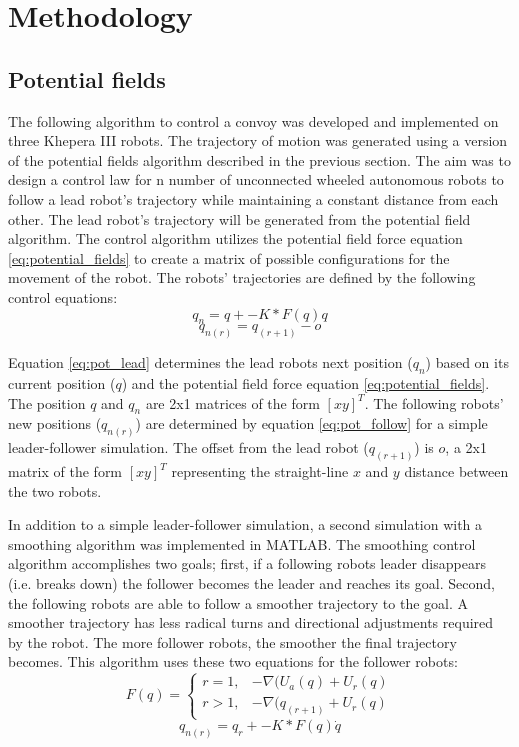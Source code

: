 \chapter{Methodology}
\section{Potential fields}
The following algorithm to control a convoy was developed and implemented on three Khepera III robots. The trajectory of motion was generated using a version of the potential fields algorithm described in the previous section. The aim was to design a control law for n number of unconnected wheeled autonomous robots to follow a lead robot's trajectory while maintaining a constant distance from each other. The lead robot's trajectory will be generated from the potential field algorithm. The control algorithm utilizes the potential field force equation \eqref{eq:potential_fields} to create a matrix of possible configurations for the movement of the robot. The robots' trajectories are defined by the following control equations:
\begin{equation} \label{eq:pot_lead}
	q_n=q+-K*F(q)q
\end{equation}
\begin{equation} \label{eq:pot_follow}
	q_{n(r)}=q_{(r+1)}-o
\end{equation}

Equation \eqref{eq:pot_lead} determines the lead robots next position ($q_n$) based on its current position ($q$) and the potential field force equation \eqref{eq:potential_fields}. The position $q$ and $q_n$ are 2x1 matrices of the form $[x y]^T$. The following robots' new positions ($q_{n(r)}$) are determined by equation \eqref{eq:pot_follow} for a simple leader-follower simulation. The offset from the lead robot ($q_{(r+1)}$) is $o$, a 2x1 matrix of the form $[x y]^T$ representing the straight-line $x$ and $y$ distance between the two robots.

In addition to a simple leader-follower simulation, a second simulation with a smoothing algorithm was implemented in MATLAB. The smoothing control algorithm accomplishes two goals; first, if a following robots leader disappears (i.e. breaks down) the follower becomes the leader and reaches its goal. Second, the following robots are able to follow a smoother trajectory to the goal. A smoother trajectory has less radical turns and directional adjustments required by the robot. The more follower robots, the smoother the final trajectory becomes. This algorithm uses these two equations for the follower robots:
\begin{equation} \label{eq:pot_follow_force}
	F(q) =
	\begin{cases}
		r=1, & -\nabla(U_a(q)+U_r(q) \\
		r>1, & -\nabla(q_{(r+1)}+U_r(q)
	\end{cases}
\end{equation}
\begin{equation} \label{eq:pot_follow_q}
	q_{n(r)}=q_r+-K*F(q)\dot{q}
\end{equation}

